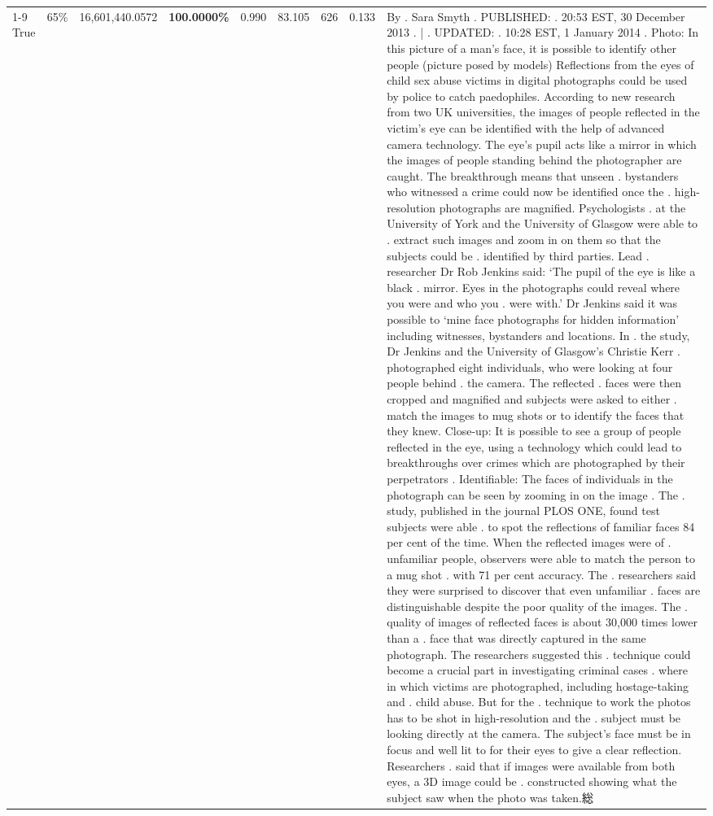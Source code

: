 \begin{table}[H]
\begin{tabular}{lllrlllll}
\cline{1-9} \cline{2-9}
True & 65\% & 16,601,440.0572 & \bfseries \color{red} 100.0000\% & 0.990 & 83.105 & 626 & 0.133 & By . Sara Smyth . PUBLISHED: . 20:53 EST, 30 December 2013 . | . UPDATED: . 10:28 EST, 1 January 2014 . Photo: In this picture of a man's face, it is possible to identify other people (picture posed by models) Reflections from the eyes of child sex abuse victims in digital photographs could be used by police to catch paedophiles. According to new research from two UK universities, the images of people reflected in the victim's eye can be identified with the help of advanced camera technology. The eye's pupil acts like a mirror in which the images of people standing behind the photographer are caught. The breakthrough means that unseen . bystanders who witnessed a crime could now be identified once the . high-resolution photographs are magnified. Psychologists . at the University of York and the University of Glasgow were able to . extract such images and zoom in on them so that the subjects could be . identified by third parties. Lead . researcher Dr Rob Jenkins said: ‘The pupil of the eye is like a black . mirror. Eyes in the photographs could reveal where you were and who you . were with.' Dr Jenkins said it was possible to ‘mine face photographs for hidden information' including witnesses, bystanders and locations. In . the study, Dr Jenkins and the University of Glasgow's Christie Kerr . photographed eight individuals, who were looking at four people behind . the camera. The reflected . faces were then cropped and magnified and subjects were asked to either . match the images to mug shots or to identify the faces that they knew. Close-up: It is possible to see a group of people reflected in the eye, using a technology which could lead to breakthroughs over crimes which are photographed by their perpetrators . Identifiable: The faces of individuals in the photograph can be seen by zooming in on the image . The . study, published in the journal PLOS ONE, found test subjects were able . to spot the reflections of familiar faces 84 per cent of the time. When the reflected images were of . unfamiliar people, observers were able to match the person to a mug shot . with 71 per cent accuracy. The . researchers said they were surprised to discover that even unfamiliar . faces are distinguishable despite the poor quality of the images. The . quality of images of reflected faces is about 30,000 times lower than a . face that was directly captured in the same photograph. The researchers suggested this . technique could become a crucial part in investigating criminal cases . where in which victims are photographed, including hostage-taking and . child abuse. But for the . technique to work the photos has to be shot in high-resolution and the . subject must be looking directly at the camera. The subject's face must be in focus and well lit to for their eyes to give a clear reflection. Researchers . said that if images were available from both eyes, a 3D image could be . constructed showing what the subject saw when the photo was taken.総 \\

\end{tabular}
\end{table}
